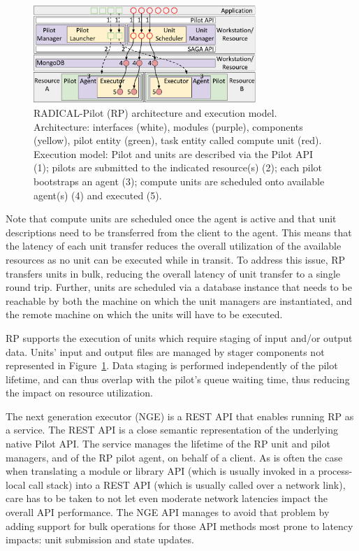 \documentclass{webofc}
\begin{document}
\begin{figure}
  \centering
  \includegraphics[width=0.75\textwidth]{figures/rp_arch.pdf}
  \caption{RADICAL-Pilot (RP) architecture and execution model.
           Architecture: interfaces (white), modules (purple), components
           (yellow), pilot entity (green), task entity called compute unit
           (red). Execution model: Pilot and units are described via the
           Pilot API (1); pilots are submitted to the indicated resource(s)
           (2); each pilot bootstraps an agent (3); compute units are
           scheduled onto available agent(s) (4) and executed
           (5).}\label{fig:rp-arch}
\end{figure}
	
Note that compute units are scheduled once the agent is active and that unit
descriptions need to be transferred from the client to the agent. This means
that the latency of each unit transfer reduces the overall utilization of the
available resources as no unit can be executed while in transit. To address
this issue, RP transfers units in bulk, reducing the overall latency of unit
transfer to a single round trip. Further, units are scheduled via a database
instance that needs to be reachable by both the machine on which the unit
managers are instantiated, and the remote machine on which the units will have
to be executed.
	
RP supports the execution of units which require staging of input and/or
output data. Units’ input and output files are managed by stager components
not represented in Figure~\ref{fig:rp-arch}. Data staging is performed
independently of the pilot lifetime, and can thus overlap with the pilot's
queue waiting time, thus reducing the impact on resource utilization.
	
The next generation executor (NGE) is a REST API that enables running RP as a
service. The REST API is a close semantic representation of the underlying
native Pilot API.  The service manages the lifetime of the RP unit and pilot
managers, and of the RP pilot agent, on behalf of a client. As is often the
case when translating a module or library API (which is usually invoked in a
process-local call stack) into a REST API (which is usually called over a
network link), care has to be taken to not let even moderate network
latencies impact the overall API performance.  The NGE API manages to avoid
that problem by adding support for bulk operations for those API methods most
prone to latency impacts: unit submission and state updates.
	
\end{document}
